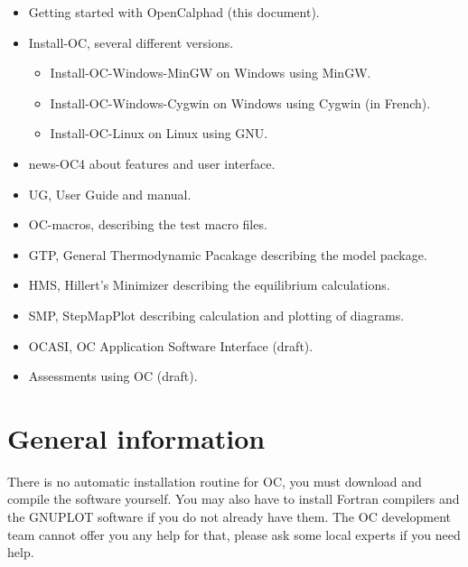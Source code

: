 \documentclass[12pt]{article}
\begin{document}
\begin{itemize}
\item Getting started with OpenCalphad (this document).
\item Install-OC, several different versions.
\begin{itemize}
\item Install-OC-Windows-MinGW on Windows using MinGW.
\item Install-OC-Windows-Cygwin on Windows using Cygwin (in French).
\item Install-OC-Linux on Linux using GNU.
\end{itemize}
\item news-OC4 about features and user interface.
\item UG, User Guide and manual.
\item OC-macros, describing the test macro files.
\item GTP, General Thermodynamic Pacakage describing the model package.
\item HMS, Hillert's Minimizer describing the equilibrium calculations.
\item SMP, StepMapPlot describing calculation and plotting of diagrams.
\item OCASI, OC Application Software Interface (draft).
\item Assessments using OC (draft).
\end{itemize}

\section{General information}

There is no automatic installation routine for OC, you must download
and compile the software yourself.  You may also have to install
Fortran compilers and the GNUPLOT software if you do not already have
them.  The OC development team cannot offer you any help for that,
please ask some local experts if you need help.
\end{document}
